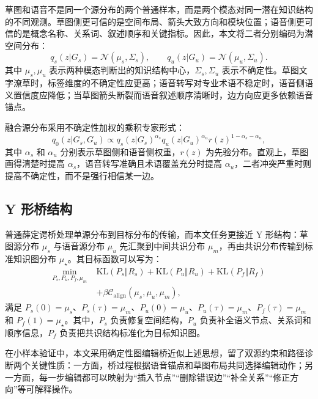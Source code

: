 \documentclass[UTF8,a4paper,12pt,fontset=fandol]{ctexart}
\begin{document}
草图和语音不是同一个源分布的两个普通样本，而是两个模态对同一潜在知识结构的不同观测。草图侧更可信的是空间布局、箭头大致方向和模块位置；语音侧更可信的是概念名称、关系词、叙述顺序和关键指标。因此，本文将二者分别编码为潜空间分布：
\begin{equation}
  q_s(z|G_s)=\mathcal N(\mu_s,\Sigma_s), \qquad
  q_u(z|G_u)=\mathcal N(\mu_u,\Sigma_u).
\end{equation}
其中 $\mu_s,\mu_u$ 表示两种模态判断出的知识结构中心，$\Sigma_s,\Sigma_u$ 表示不确定性。草图文字潦草时，标签维度的不确定性应更高；语音转写对专业术语不稳定时，语音侧语义置信度应降低；当草图箭头断裂而语音叙述顺序清晰时，边方向应更多依赖语音锚点。

融合源分布采用不确定性加权的乘积专家形式：
\begin{equation}
  q_0(z|G_s,G_u)\propto q_s(z|G_s)^{\alpha_s}q_u(z|G_u)^{\alpha_u}r(z)^{1-\alpha_s-\alpha_u},
\end{equation}
其中 $\alpha_s$ 和 $\alpha_u$ 分别表示草图侧和语音侧权重，$r(z)$ 为先验分布。直观上，草图画得清楚时提高 $\alpha_s$，语音转写准确且术语覆盖充分时提高 $\alpha_u$，二者冲突严重时则提高不确定性，而不是强行相信某一边。

\subsection{Y 形桥结构}

普通薛定谔桥处理单源分布到目标分布的传输，而本文任务更接近 Y 形结构：草图源分布 $\mu_s$ 与语音源分布 $\mu_u$ 先汇聚到中间共识分布 $\mu_m$，再由共识分布传输到标准知识图分布 $\mu_\star$。其目标函数可以写为：
\begin{equation}
\begin{aligned}
  \min_{P_s,P_u,P_f,\mu_m}\;&
  \mathrm{KL}(P_s\Vert R_s)
  + \mathrm{KL}(P_u\Vert R_u)
  + \mathrm{KL}(P_f\Vert R_f)\\
  &+ \beta \mathcal C_{\mathrm{align}}(\mu_s,\mu_u,\mu_m),
\end{aligned}
\end{equation}
满足 $P_s(0)=\mu_s$、$P_s(\tau)=\mu_m$、$P_u(0)=\mu_u$、$P_u(\tau)=\mu_m$、$P_f(\tau)=\mu_m$ 和 $P_f(1)=\mu_\star$。其中，$P_s$ 负责修复空间结构，$P_u$ 负责补全语义节点、关系词和顺序信息，$P_f$ 负责把共识结构标准化为目标知识图。

在小样本验证中，本文采用确定性图编辑桥近似上述思想，留了双源约束和路径诊断两个关键性质：一方面，桥过程根据语音锚点和草图布局共同选择编辑动作；另一方面，每一步编辑都可以映射为“插入节点”“删除错误边”“补全关系”“修正方向”等可解释操作。
\end{document}
